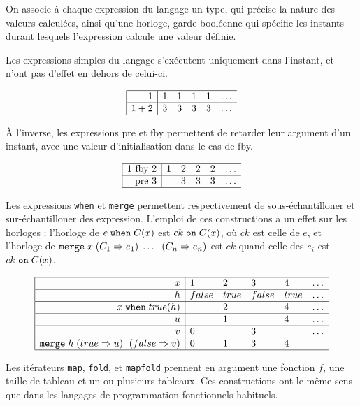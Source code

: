 \documentclass[a4paper]{article}
\newcommand{\mybox}[1]{\mbox{\tt{#1}}}
\newcommand{\When}[3]{#1 \; \mybox{when} \; #2(#3)}
\newcommand{\Merge}[5]{\mybox{merge} \; #1 \; (#2 \Rightarrow #3) \; \dots \; \
  (#4 \Rightarrow #5)}
\newcommand{\Merges}[5]{\mybox{merge} \; #1 \; (#2 \Rightarrow #3) \; \
  (#4 \Rightarrow #5)}
\newcommand{\On}[3]{#1 \; \mybox{on} \; #2 (#3)}
\begin{document}
On associe à chaque expression du langage un type, qui précise la nature des
valeurs calculées, ainsi qu'une horloge, garde booléenne qui spécifie les
instants durant lesquels l'expression calcule une valeur définie.

Les expressions simples du langage s'exécutent uniquement dans l'instant, et
n'ont pas d'effet en dehors de celui-ci.

\[
\begin{array}{|r|llllllllllllllllllllllllllll}
  \hline
  1     & 1 & 1 & 1 & 1 & \dots \\
  \hline
  1 + 2 & 3 & 3 & 3 & 3 & \dots \\
  \hline
\end{array}
\]

À l'inverse, les expressions \textrm{pre} et \textrm{fby} permettent de retarder
leur argument d'un instant, avec une valeur d'initialisation dans le cas de
\textrm{fby}.

\[
\begin{array}{|r|llllllllllllllllllllllllllll}
  \hline
  1 \ \mathrm{fby} \ 2 & 1 & 2 & 2 & 2 & \dots \\
  \hline
  \mathrm{pre} \ 3 &  & 3 & 3 & 3 & \dots \\
  \hline
\end{array}
\]

Les expressions \texttt{when} et \texttt{merge} permettent respectivement de
sous-échantilloner et sur-échantilloner des expression. L'emploi de ces
constructions a un effet sur les horloges : l'horloge de $\When{e}{C}{x}$ est
$\On{ck}{C}{x}$, où $ck$ est celle de $e$, et l'horloge de
$\Merge{x}{C_1}{e_1}{C_n}{e_n}$ est $ck$ quand celle des $e_i$ est
$\On{ck}{C}{x}$.

\[
\begin{array}{|r|llllllllllllllllllllllllllll}
  \hline
  x & 1 & 2 & 3 & 4 & \dots \\
  \hline
  h & false & true & false & true & \dots \\
  \hline
  \When{x}{true}{h} & & 2 & & 4 & \dots \\
  \hline
  u &  & 1 & & 4 & \dots \\
  \hline
  v & 0 & & 3 & & \dots \\
  \hline
  \Merges{h}{true}{u}{false}{v} & 0 & 1 & 3 & 4 \\
  \hline
\end{array}
\]

Les itérateurs \texttt{map}, \texttt{fold}, et \texttt{mapfold} prennent en
argument une fonction $f$, une taille de tableau et un ou plusieurs
tableaux. Ces constructions ont le même sens que dans les langages de
programmation fonctionnels habituels.
\end{document}
